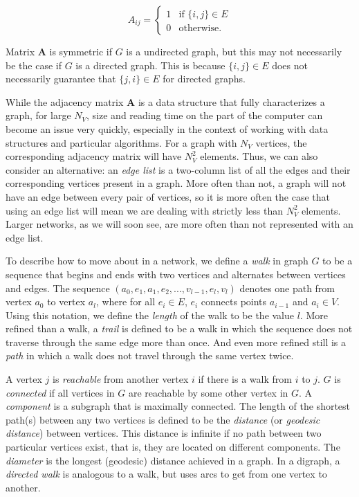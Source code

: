 \documentclass[12pt,twoside]{amherstthesis}
\begin{document}
  \[ A_{ij} = \begin{cases}
      1 & \text{if } \{i, j\} \in E \\
      0 & \text{otherwise.} 
    \end{cases}
  \]
  
  Matrix \(\textbf{A}\) is symmetric if \(G\) is a undirected graph, but
  this may not necessarily be the case if \(G\) is a directed graph. This
  is because \(\{i, j\} \in E\) does not necessarily guarantee that
  \(\{j, i\} \in E\) for directed graphs.
  
  While the adjacency matrix \(\textbf{A}\) is a data structure that fully
  characterizes a graph, for large \(N_{V}\), size and reading time on the
  part of the computer can become an issue very quickly, especially in the
  context of working with data structures and particular algorithms. For a
  graph with \(N_{V}\) vertices, the corresponding adjacency matrix will
  have \(N_{V}^{2}\) elements. Thus, we can also consider an alternative:
  an \emph{edge list} is a two-column list of all the edges and their
  corresponding vertices present in a graph. More often than not, a graph
  will not have an edge between every pair of vertices, so it is more
  often the case that using an edge list will mean we are dealing with
  strictly less than \(N_{V}^{2}\) elements. Larger networks, as we will
  soon see, are more often than not represented with an edge list.
  
  To describe how to move about in a network, we define a \emph{walk} in
  graph \(G\) to be a sequence that begins and ends with two vertices and
  alternates between vertices and edges. The sequence
  \((a_0, e_1, a_1, e_2, ..., v_{l-1}, e_l, v_l)\) denotes one path from
  vertex \(a_0\) to vertex \(a_l\), where for all \(e_i \in E\), \(e_i\)
  connects points \(a_{i-1}\) and \(a_i \in V\). Using this notation, we
  define the \emph{length} of the walk to be the value \(l\). More refined
  than a walk, a \emph{trail} is defined to be a walk in which the
  sequence does not traverse through the same edge more than once. And
  even more refined still is a \emph{path} in which a walk does not travel
  through the same vertex twice.
  
  A vertex \(j\) is \emph{reachable} from another vertex \(i\) if there is
  a walk from \(i\) to \(j\). \(G\) is \emph{connected} if all vertices in
  \(G\) are reachable by some other vertex in \(G\). A \emph{component} is
  a subgraph that is maximally connected. The length of the shortest
  path(s) between any two vertices is defined to be the \emph{distance}
  (or \emph{geodesic distance}) between vertices. This distance is
  infinite if no path between two particular vertices exist, that is, they
  are located on different components. The \emph{diameter} is the longest
  (geodesic) distance achieved in a graph. In a digraph, a \emph{directed
  walk} is analogous to a walk, but uses arcs to get from one vertex to
  another.
  
\end{document}
